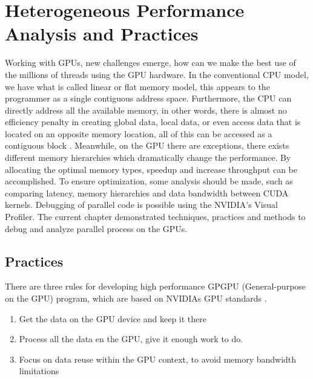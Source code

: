 \chapter{Heterogeneous Performance Analysis and Practices} %

\label{Heterogeneous Performance Analysis and Practices} %


Working with GPUs, new challenges emerge, how can we make the best use of the millions of threads using the GPU hardware. In the conventional CPU model, we have what is called linear or flat memory model, this appears to the programmer as a single contiguous address space. Furthermore, the CPU can directly address all the available memory, in other words, there is almost no efficiency penalty in creating global data, local data, or even access data that is located on an opposite memory location, all of this can be accessed as a contiguous block \cite{cook}. Meanwhile, on the GPU there are exceptions, there exists different memory hierarchies which dramatically change the performance. By allocating the optimal memory types, speedup and increase throughput can be accomplished. To ensure optimization, some analysis should be made, such as comparing latency, memory hierarchies and data bandwidth between CUDA kernels. Debugging of parallel code is possible  using the NVIDIA's Visual Profiler. The current chapter demonstrated techniques, practices and methods to debug and analyze parallel process on the GPUs.

\section{Practices}

There are three rules for developing high performance GPGPU (General-purpose on the GPU) program, which are based on NVIDIAs GPU standards \cite{design}.

\begin{enumerate}
  \item Get the data on the GPU device and keep it there
  \item Process all the data en the GPU, give it enough work to do.
  \item Focus on data reuse within the GPU context, to avoid memory bandwidth limitations
\end{enumerate}

